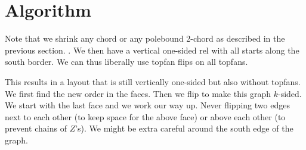 \section{Algorithm}
Note that we shrink any chord or any polebound 2-chord as described in the previous section. . We then have a vertical one-sided rel with all starts along the south border. We can thus liberally use topfan flips on all topfans.

This results in a layout that is still vertically one-sided but also without topfans. We first find the new order in the faces. Then we flip to make this graph $k$-sided. We start with the last face and we work our way up. Never flipping two edges next to each other (to keep space for the above face) or above each other (to prevent chains of $Z$'s). We might be extra careful around the south edge of the graph.
